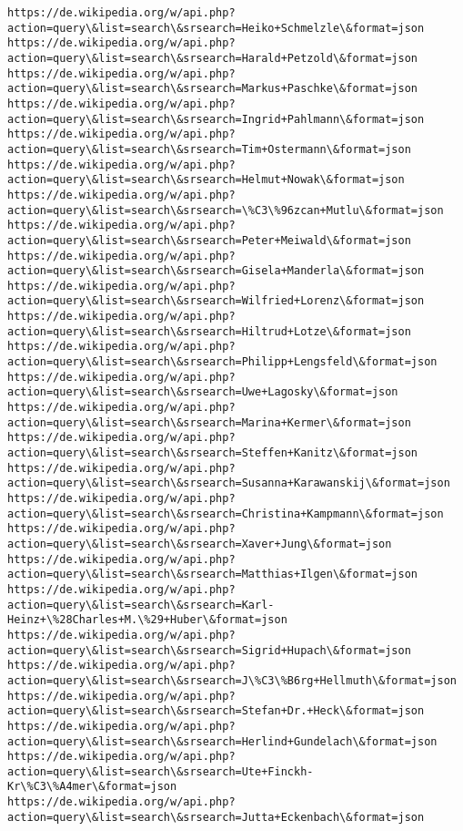 \documentclass[11pt]{article}
\begin{document}
\begin{Verbatim}[commandchars=\\\{\}]
https://de.wikipedia.org/w/api.php?action=query\&list=search\&srsearch=Heiko+Schmelzle\&format=json
https://de.wikipedia.org/w/api.php?action=query\&list=search\&srsearch=Harald+Petzold\&format=json
https://de.wikipedia.org/w/api.php?action=query\&list=search\&srsearch=Markus+Paschke\&format=json
https://de.wikipedia.org/w/api.php?action=query\&list=search\&srsearch=Ingrid+Pahlmann\&format=json
https://de.wikipedia.org/w/api.php?action=query\&list=search\&srsearch=Tim+Ostermann\&format=json
https://de.wikipedia.org/w/api.php?action=query\&list=search\&srsearch=Helmut+Nowak\&format=json
https://de.wikipedia.org/w/api.php?action=query\&list=search\&srsearch=\%C3\%96zcan+Mutlu\&format=json
https://de.wikipedia.org/w/api.php?action=query\&list=search\&srsearch=Peter+Meiwald\&format=json
https://de.wikipedia.org/w/api.php?action=query\&list=search\&srsearch=Gisela+Manderla\&format=json
https://de.wikipedia.org/w/api.php?action=query\&list=search\&srsearch=Wilfried+Lorenz\&format=json
https://de.wikipedia.org/w/api.php?action=query\&list=search\&srsearch=Hiltrud+Lotze\&format=json
https://de.wikipedia.org/w/api.php?action=query\&list=search\&srsearch=Philipp+Lengsfeld\&format=json
https://de.wikipedia.org/w/api.php?action=query\&list=search\&srsearch=Uwe+Lagosky\&format=json
https://de.wikipedia.org/w/api.php?action=query\&list=search\&srsearch=Marina+Kermer\&format=json
https://de.wikipedia.org/w/api.php?action=query\&list=search\&srsearch=Steffen+Kanitz\&format=json
https://de.wikipedia.org/w/api.php?action=query\&list=search\&srsearch=Susanna+Karawanskij\&format=json
https://de.wikipedia.org/w/api.php?action=query\&list=search\&srsearch=Christina+Kampmann\&format=json
https://de.wikipedia.org/w/api.php?action=query\&list=search\&srsearch=Xaver+Jung\&format=json
https://de.wikipedia.org/w/api.php?action=query\&list=search\&srsearch=Matthias+Ilgen\&format=json
https://de.wikipedia.org/w/api.php?action=query\&list=search\&srsearch=Karl-Heinz+\%28Charles+M.\%29+Huber\&format=json
https://de.wikipedia.org/w/api.php?action=query\&list=search\&srsearch=Sigrid+Hupach\&format=json
https://de.wikipedia.org/w/api.php?action=query\&list=search\&srsearch=J\%C3\%B6rg+Hellmuth\&format=json
https://de.wikipedia.org/w/api.php?action=query\&list=search\&srsearch=Stefan+Dr.+Heck\&format=json
https://de.wikipedia.org/w/api.php?action=query\&list=search\&srsearch=Herlind+Gundelach\&format=json
https://de.wikipedia.org/w/api.php?action=query\&list=search\&srsearch=Ute+Finckh-Kr\%C3\%A4mer\&format=json
https://de.wikipedia.org/w/api.php?action=query\&list=search\&srsearch=Jutta+Eckenbach\&format=json

\end{Verbatim}
\end{document}
